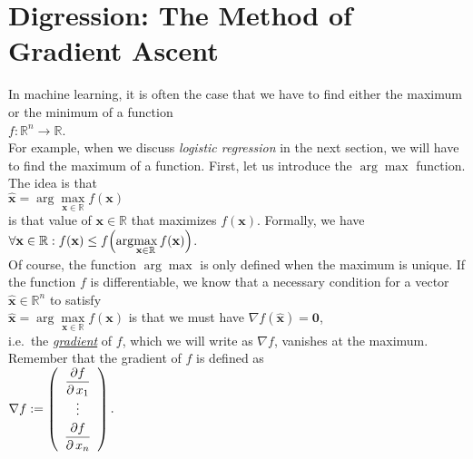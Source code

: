\section{Digression: The Method of Gradient Ascent \label{section:gradient-ascent}}
In machine learning, it is often the case that we have to find either the maximum or the minimum of a function
\\[0.2cm]
\hspace*{1.3cm}
$f: \mathbb{R}^n \rightarrow \mathbb{R}$.
\\[0.2cm]
For example, when we discuss \emph{logistic regression} in the next section, we will have to find the maximum of a
function.  First, let us introduce the $\arg\!\max$ function.  The idea is that
\\[0.2cm]
\hspace*{1.3cm}
$\mathbf{\widehat{x}} = \arg\!\max\limits_{\mathbf{x}\in \mathbb{R}} f(\mathbf{x})$
\\[0.2cm]
is that value of $\mathbf{x} \in \mathbb{R}$ that maximizes $ f(\mathbf{x})$.  Formally, we have
\\[0.2cm]
\hspace*{1.3cm}
$\forall \mathbf{x} \in \mathbb{R} : f(\mathbf{x}) \leq f\Bigl(\arg\!\max\limits_{\mathbf{x}\in \mathbb{R}} f(\mathbf{x})\Bigr)$.
\\[0.2cm]
Of course, the function $\arg\!\max$ is only defined when the maximum is unique.
If the function $f$ is differentiable, we know that a necessary condition for a vector $\mathbf{\widehat{x}} \in \mathbb{R}^n$
to satisfy
\\[0.2cm]
\hspace*{1.3cm}
$\mathbf{\widehat{x}} = \arg\max\limits_{\mathbf{x}\in \mathbb{R}} f(\mathbf{x})$ \quad is that we must have \quad $\nabla f(\mathbf{\widehat{x}}) = \mathbf{0}$,
\\[0.2cm]
i.e.~the \href{https://en.wikipedia.org/wiki/Gradient}{\emph{gradient}} of $f$, which we will write as $\nabla f$,
vanishes at the maximum.  Remember that the gradient of $f$ is defined as
\\[0.2cm]
\hspace*{1.3cm}
$\nabla f := \left(
 \begin{array}{c}
 \displaystyle\frac{\partial f}{\partial\, x_1} \\
    \vdots                            \\[0.1cm]
 \displaystyle\frac{\partial f}{\partial\, x_n} \\ 
 \end{array}
 \right).
$

